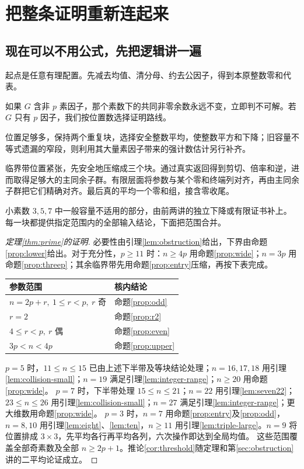 \chapter{把整条证明重新连起来}\label{sec:completion}
\section{现在可以不用公式，先把逻辑讲一遍}
起点是任意有理配置。先减去均值、清分母、约去公因子，得到本原整数零和代表。

如果 $G$ 含非 $p$ 素因子，那个素数下的共同非零余数永远不变，立即判不可解。若 $G$ 只有 $p$ 因子，我们按位置数选择证明路线。

位置足够多，保持两个重复块，选择安全整数平均，使整数平方和下降；旧容量不等式遗漏的窄段，则利用其大量素因子带来的强计数估计另行补齐。

临界带位置紧张，先安全地压缩成三个块。通过真实返回得到剪切、倍率和逆，进而取得足够大的主同余子群。有限层面将参数与某个零和终端列对齐，再由主同余子群把它们精确对齐。最后真的平均一个零和组，接含零收尾。

小素数 $3,5,7$ 中一般容量不适用的部分，由前两讲的独立下降或有限证书补上。每一块都提供指定范围内的全部输入结论，下面把范围合并。
\begin{proof}[定理\ref{thm:prime}的证明]
必要性由引理\ref{lem:obstruction}给出，下界由命题\ref{prop:lower}给出。对于充分性，$p\ge11$ 时：$n\ge4p$ 用命题\ref{prop:wide}；$n=3p$ 用命题\ref{prop:threep}；其余临界带先用命题\ref{prop:entry}压缩，再按下表完成。
\begin{center}
\begin{tabular}{ll}
\toprule 参数范围 & 核内结论\\\midrule
$n=2p+r,\ 1\le r<p,\ r$ 奇 & 命题\ref{prop:odd}\\
$r=2$ & 命题\ref{prop:r2}\\
$4\le r<p,\ r$ 偶 & 命题\ref{prop:even}\\
$3p<n<4p$ & 命题\ref{prop:upper}\\\bottomrule
\end{tabular}
\end{center}
$p=5$ 时，$11\le n\le15$ 已由上述下半带及等块结论处理；$n=16,17,18$ 用引理\ref{lem:collision-small}；$n=19$ 满足引理\ref{lem:integer-range}；$n\ge20$ 用命题\ref{prop:wide}。
$p=7$ 时，下半带处理 $15\le n\le21$；$n=22$ 用引理\ref{lem:seven22}；$23\le n\le26$ 用引理\ref{lem:collision-small}；$n=27$ 满足引理\ref{lem:integer-range}；更大维数用命题\ref{prop:wide}。
$p=3$ 时，$n=7$ 用命题\ref{prop:entry}及\ref{prop:odd}，$n=8,10$ 用引理\ref{lem:eight}、\ref{lem:ten}，$n\ge11$ 用引理\ref{lem:triple-large}。$n=9$ 将位置排成 $3\times3$，先平均各行再平均各列，六次操作即达到全局均值。
这些范围覆盖全部奇素数及全部 $n\ge2p+1$。推论\ref{cor:threshold}随定理和第\ref{sec:obstruction}讲的二平均论证成立。
\end{proof}

